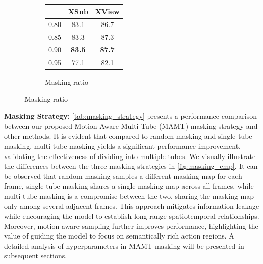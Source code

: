 \begin{figure}[tb]
\begin{subfigure}[t]{0.24\linewidth}
\begin{tabular}{c c c}
            & XSub & XView \\
            \midrule
            0.80 & 83.1 & 86.7 \\
            0.85 & 83.3 & 87.3 \\
            0.90 & \textbf{83.5} & \textbf{87.7} \\
            0.95 & 77.1 & 82.1 \\
            \bottomrule
        \end{tabular}
        \caption{Masking ratio}
        \label{tab:masking_ratio}
    \end{subfigure}
    \label{tab:masking_ratio_and_beta}
    \vspace{-18pt}
\end{figure}

\noindent \textbf{Masking Strategy:}
\cref{tab:masking_strategy} presents a performance comparison between our
proposed Motion-Aware Multi-Tube (MAMT) masking strategy and other methods.
It is evident that compared to random masking and single-tube masking,
multi-tube masking yields a significant performance improvement,
validating the effectiveness of dividing into multiple tubes.
We visually illustrate the differences between the three masking strategies
in \cref{fig:masking_cmp}. It can be observed that random masking samples a different
masking map for each frame, single-tube masking shares a single masking map
across all frames, while multi-tube masking is a compromise between the two,
sharing the masking map only among several adjacent frames.
This approach mitigates information leakage while encouraging the model to
establish long-range spatiotemporal relationships.
Moreover, motion-aware sampling
further improves performance, highlighting the value of guiding the model to focus
on semantically rich action regions. A detailed analysis of hyperparameters in
MAMT masking will be presented in subsequent sections.

